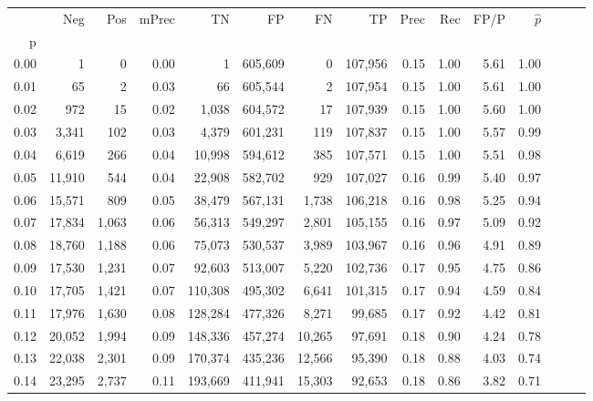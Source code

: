 \begin{tabular}{rrrrrrrrrrrrrrr}
\toprule
{} &     Neg &    Pos & mPrec &       TN &       FP &       FN &       TP &  Prec &   Rec &  FP/P & $\hat{p}$ \\
p    &         &        &       &          &          &          &          &       &       &       &           \\
\midrule
0.00 &       1 &      0 &  0.00 &        1 &  605,609 &        0 &  107,956 &  0.15 &  1.00 &  5.61 &      1.00 \\
0.01 &      65 &      2 &  0.03 &       66 &  605,544 &        2 &  107,954 &  0.15 &  1.00 &  5.61 &      1.00 \\
0.02 &     972 &     15 &  0.02 &    1,038 &  604,572 &       17 &  107,939 &  0.15 &  1.00 &  5.60 &      1.00 \\
0.03 &   3,341 &    102 &  0.03 &    4,379 &  601,231 &      119 &  107,837 &  0.15 &  1.00 &  5.57 &      0.99 \\
0.04 &   6,619 &    266 &  0.04 &   10,998 &  594,612 &      385 &  107,571 &  0.15 &  1.00 &  5.51 &      0.98 \\
0.05 &  11,910 &    544 &  0.04 &   22,908 &  582,702 &      929 &  107,027 &  0.16 &  0.99 &  5.40 &      0.97 \\
0.06 &  15,571 &    809 &  0.05 &   38,479 &  567,131 &    1,738 &  106,218 &  0.16 &  0.98 &  5.25 &      0.94 \\
0.07 &  17,834 &  1,063 &  0.06 &   56,313 &  549,297 &    2,801 &  105,155 &  0.16 &  0.97 &  5.09 &      0.92 \\
0.08 &  18,760 &  1,188 &  0.06 &   75,073 &  530,537 &    3,989 &  103,967 &  0.16 &  0.96 &  4.91 &      0.89 \\
0.09 &  17,530 &  1,231 &  0.07 &   92,603 &  513,007 &    5,220 &  102,736 &  0.17 &  0.95 &  4.75 &      0.86 \\
0.10 &  17,705 &  1,421 &  0.07 &  110,308 &  495,302 &    6,641 &  101,315 &  0.17 &  0.94 &  4.59 &      0.84 \\
0.11 &  17,976 &  1,630 &  0.08 &  128,284 &  477,326 &    8,271 &   99,685 &  0.17 &  0.92 &  4.42 &      0.81 \\
0.12 &  20,052 &  1,994 &  0.09 &  148,336 &  457,274 &   10,265 &   97,691 &  0.18 &  0.90 &  4.24 &      0.78 \\
0.13 &  22,038 &  2,301 &  0.09 &  170,374 &  435,236 &   12,566 &   95,390 &  0.18 &  0.88 &  4.03 &      0.74 \\
0.14 &  23,295 &  2,737 &  0.11 &  193,669 &  411,941 &   15,303 &   92,653 &  0.18 &  0.86 &  3.82 &      0.71 \\

\end{tabular}
